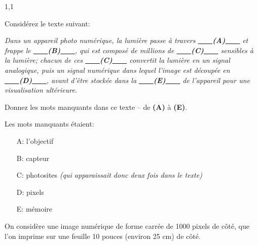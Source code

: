 \documentclass[11pt,a4paper]{exam}
\begin{document}
\begin{spacing}{1,1}
\begin{questions}
			\question[2 \half] Considérez le texte suivant:
			
			\textit{Dans un appareil photo numérique, la lumière passe à travers \uline{\ \ \ \ }\textbf{(A)}\uline{\ \ \ \ } et frappe le \uline{\ \ \ \ }\textbf{(B)}\uline{\ \ \ \ }, qui est composé de millions de \uline{\ \ \ \ }\textbf{(C)}\uline{\ \ \ \ } sensibles à la lumière; chacun de ces \uline{\ \ \ \ }\textbf{(C)}\uline{\ \ \ \ } convertit la lumière en un signal analogique, puis un signal numérique dans lequel l'image est découpée en \uline{\ \ \ \ }\textbf{(D)}\uline{\ \ \ \ }, avant d'être stockée dans la \uline{\ \ \ \ }\textbf{(E)}\uline{\ \ \ \ } de l'appareil pour une visualisation ultérieure.}
			
			Donnez les mots manquants dans ce texte -- de \textbf{(A)} à \textbf{(E)}.
			
			\begin{solution}
				Les mots manquants étaient:
				\begin{itemize}
					\item[ A: ] l'objectif
					\item[ B: ] capteur
					\item[ C: ] photosites \textit{(qui apparaissait donc deux fois dans le texte)}
					\item[ D: ] pixels
					\item[ E: ] mémoire
				\end{itemize}
			\end{solution}
			
			\question On considère une image numérique de forme carrée de 1000 pixels de côté, que l'on imprime sur une feuille 10 pouces (environ 25 cm) de côté.
			
\end{questions}
\end{spacing}
\end{document}
